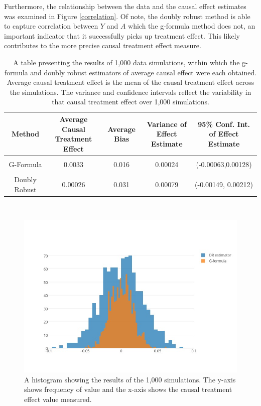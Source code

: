 Furthermore, the relationship between the data and the causal effect estimates was examined in Figure \ref{correlation}.  Of note, the doubly robust method is able to capture correlation between $Y$ and $A$ which the g-formula method does not, an important indicator that it successfully picks up treatment effect.  This likely contributes to the more precise causal treatment effect measure.  

\begin{table}[h!]
\centering
\begin{tabular}{c | c c c c }
Method & \shortstack{Average Causal \\ Treatment Effect} & Average Bias & \shortstack{Variance of \\ Effect Estimate} & \shortstack{95\% Conf. Int.\\ of Effect Estimate} \\ 
\hline \\
G-Formula & 0.0033 & 0.016 & 0.00024&(-0.00063,0.00128)\\ \\ 
Doubly Robust & 0.00026 & 0.031& 0.00079 & (-0.00149, 0.00212)
\end{tabular} \\
\centering
\caption{A table presenting the results of 1,000 data simulations, within which the g-formula and doubly robust estimators of average causal effect were each obtained.  Average causal treatment effect is the mean of the causal treatment effect across the simulations.  The variance and confidence intervals reflect the variability in that causal treatment effect over 1,000 simulations. \label{simdata}}
\end{table}

\begin{figure}[h!]
\includegraphics[width = \linewidth]{figures/overlaid_histogram.jpeg}
\caption{A histogram showing the results of the 1,000 simulations.  The y-axis shows frequency of value and the x-axis shows the causal treatment effect value measured.}
\label{bighistogram}
\end{figure} 

